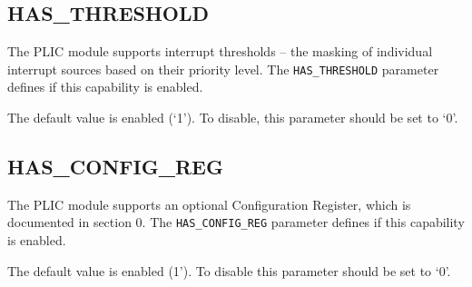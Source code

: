 \subsection{HAS\_THRESHOLD}

The PLIC module supports interrupt thresholds -- the masking of
individual interrupt sources based on their priority level. The
\texttt{HAS\_THRESHOLD} parameter defines if this capability is enabled.

The default value is enabled (`1'). To disable, this parameter should be
set to `0'.

\subsection{HAS\_CONFIG\_REG}

The PLIC module supports an optional Configuration Register, which is
documented in section 0. The \texttt{HAS\_CONFIG\_REG} parameter defines
if this capability is enabled.

The default value is enabled (1'). To disable this parameter should be
set to `0'.
